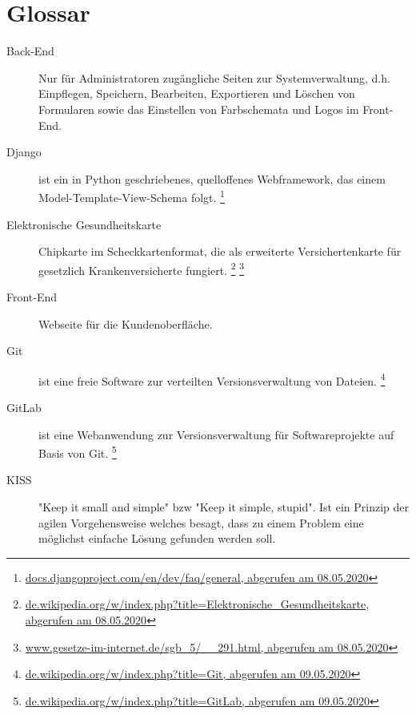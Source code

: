 \section{Glossar}

\begin{description}
  \item[Back-End]
    Nur für Administratoren zugängliche Seiten zur Systemverwaltung, d.h. Einpflegen, Speichern, Bearbeiten, Exportieren und Löschen von Formularen sowie das Einstellen von Farbschemata und Logos im Front-End.
 
  \item[Django]
    ist ein in Python geschriebenes, quelloffenes Webframework, das einem Model-Template-View-Schema folgt.
    \footnote{\href{https://docs.djangoproject.com/en/dev/faq/general}{docs.djangoproject.com/en/dev/faq/general, abgerufen am 08.05.2020}}

 \item[Elektronische Gesundheitskarte]
    Chipkarte im Scheckkartenformat, die als erweiterte Versichertenkarte für gesetzlich Krankenversicherte fungiert.
    \footnote{\href{https://de.wikipedia.org/w/index.php?title=Elektronische_Gesundheitskarte&oldid=198562236}{de.wikipedia.org/w/index.php?title=Elektronische\_Gesundheitskarte,  abgerufen am 08.05.2020}}
    \footnote{\href{https://www.gesetze-im-internet.de/sgb_5/__291.html}{www.gesetze-im-internet.de/sgb\_5/\_\_291.html, abgerufen am 08.05.2020}}
 
  \item[Front-End]
    Webseite für die Kundenoberfläche.
    
  \item[Git]
    ist eine freie Software zur verteilten Versionsverwaltung von Dateien.
    \footnote{\href{https://de.wikipedia.org/w/index.php?title=Git&oldid=199354247}{de.wikipedia.org/w/index.php?title=Git, abgerufen am 09.05.2020}}
    
  \item[GitLab]
    ist eine Webanwendung zur Versionsverwaltung für Softwareprojekte auf Basis von Git.
    \footnote{\href{https://de.wikipedia.org/w/index.php?title=GitLab&oldid=196028257}{de.wikipedia.org/w/index.php?title=GitLab, abgerufen am 09.05.2020}}
    
  \item[KISS]
    "Keep it small and simple" bzw "Keep it simple, stupid". Ist ein Prinzip der agilen Vorgehensweise welches besagt, dass zu einem Problem eine möglichst einfache Lösung gefunden werden soll.


\end{description}
